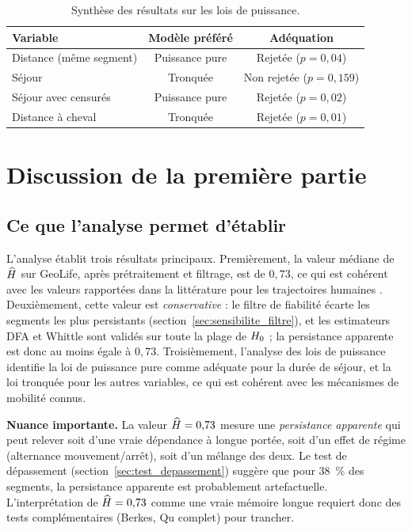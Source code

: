 \begin{table}[H]
\centering
\caption{Synthèse des résultats sur les lois de puissance.}
\label{tab:synthese_lois}
\begin{tabular}{lcc}
\toprule
Variable & Modèle préféré & Adéquation \\
\midrule
Distance (même segment) & Puissance pure & Rejetée ($p = 0{,}04$) \\
Séjour & Tronquée & Non rejetée ($p = 0{,}159$) \\
Séjour avec censurés & Puissance pure & Rejetée ($p = 0{,}02$) \\
Distance à cheval & Tronquée & Rejetée ($p = 0{,}01$) \\
\bottomrule
\end{tabular}
\end{table}

\section{Discussion de la première partie}
\label{sec:discussion1}

\subsection{Ce que l'analyse permet d'établir}
L'analyse établit trois résultats principaux. Premièrement, la valeur médiane de $\widehat{H}$ sur GeoLife, après prétraitement et filtrage, est de $0{,}73$, ce qui est cohérent avec les valeurs rapportées dans la littérature pour les trajectoires humaines \cite{yan2013}. Deuxièmement, cette valeur est \emph{conservative} : le filtre de fiabilité écarte les segments les plus persistants (section~\ref{sec:sensibilite_filtre}), et les estimateurs DFA et Whittle sont validés sur toute la plage de $H_0$ ; la persistance apparente est donc au moins égale à $0{,}73$. Troisièmement, l'analyse des lois de puissance identifie la loi de puissance pure comme adéquate pour la durée de séjour, et la loi tronquée pour les autres variables, ce qui est cohérent avec les mécanismes de mobilité connus.

\medskip
\textbf{Nuance importante.} La valeur $\widehat{H} = 0{,}73$ mesure une \emph{persistance apparente} qui peut relever soit d'une vraie dépendance à longue portée, soit d'un effet de régime (alternance mouvement/arrêt), soit d'un mélange des deux. Le test de dépassement (section~\ref{sec:test_depassement}) suggère que pour 38~\% des segments, la persistance apparente est probablement artefactuelle. L'interprétation de $\widehat{H} = 0{,}73$ comme une vraie mémoire longue requiert donc des tests complémentaires (Berkes, Qu complet) pour trancher.

